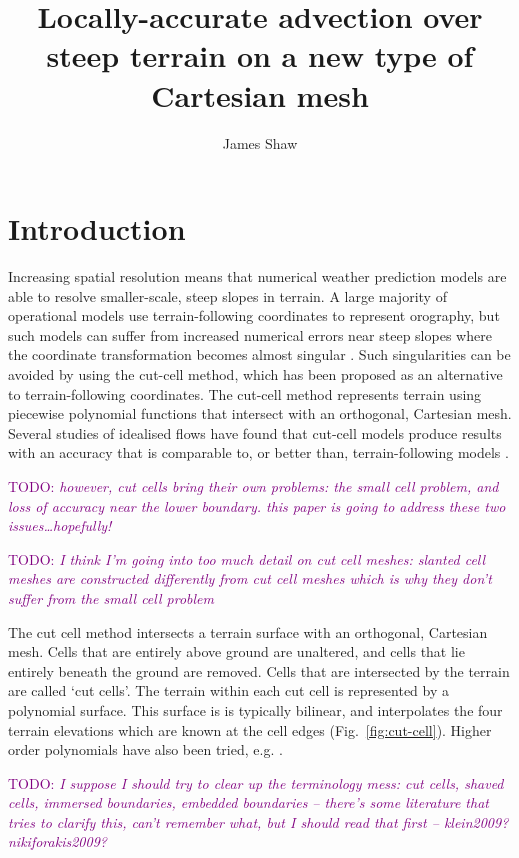 \documentclass{article}
\title{Locally-accurate advection over steep terrain on a new type of Cartesian mesh \\ \TODO{(working title)}}
\author{James Shaw}
\newcommand{\TODO}[1]{\textcolor{purple}{TODO: \emph{#1}}}
\begin{document}
\maketitle

\section{Introduction}

Increasing spatial resolution means that numerical weather prediction models are able to resolve smaller-scale, steep slopes in terrain.  A large majority of operational models use terrain-following coordinates to represent orography, but such models can suffer from increased numerical errors near steep slopes where the coordinate transformation becomes almost singular \citep{nikiforakis2009}.  Such singularities can be avoided by using the cut-cell method, which has been proposed as an alternative to terrain-following coordinates.  The cut-cell method represents terrain using piecewise polynomial functions that intersect with an orthogonal, Cartesian mesh.  Several studies of idealised flows have found that cut-cell models produce results with an accuracy that is comparable to, or better than, terrain-following models \citep{yamazaki-satomura2008,good2014,shaw-weller2016}.


\TODO{however, cut cells bring their own problems: the small cell problem, and loss of accuracy near the lower boundary.  this paper is going to address these two issues\ldots hopefully!}


\TODO{I think I'm going into too much detail on cut cell meshes: slanted cell meshes are constructed differently from cut cell meshes which is why they don't suffer from the small cell problem}

The cut cell method intersects a terrain surface with an orthogonal, Cartesian mesh.
Cells that are entirely above ground are unaltered, and cells that lie entirely beneath the ground are removed.
Cells that are intersected by the terrain are called `cut cells'.  The terrain within each cut cell is represented by a polynomial surface.  This surface is is typically bilinear, and interpolates the four terrain elevations which are known at the cell edges (Fig.~\ref{fig:cut-cell}).  Higher order polynomials have also been tried, e.g. \citet{kirkpatrick2003}.

\TODO{I suppose I should try to clear up the terminology mess: cut cells, shaved cells, immersed boundaries, embedded boundaries -- there's some literature that tries to clarify this, can't remember what, but I should read that first -- klein2009? nikiforakis2009?}
\end{document}
